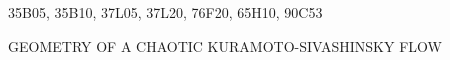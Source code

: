 \documentclass{siamltex}          %
\begin{document}
\begin{AMS}
35B05, 35B10, 37L05, 37L20, 76F20, 65H10, 90C53
\end{AMS}

\pagestyle{myheadings}
\thispagestyle{plain}
         {GEOMETRY OF A CHAOTIC KURAMOTO-SIVASHINSKY FLOW}








\appendix



% 

\end{document}
